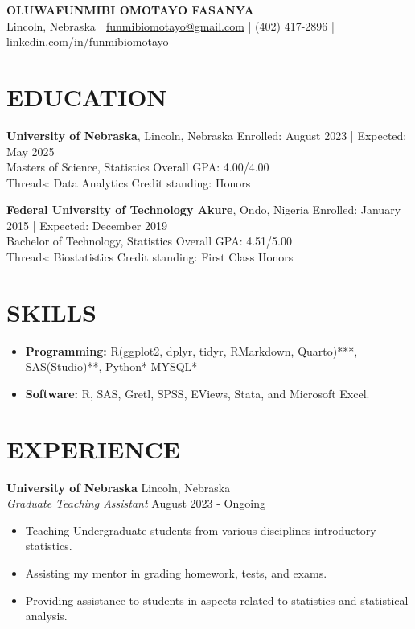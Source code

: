 \documentclass[a4paper,9pt]{extarticle}
\begin{document}
\pagestyle{empty}

\begin{center}
\textbf{\Large OLUWAFUNMIBI OMOTAYO FASANYA}\\[2pt] %
Lincoln, Nebraska | \href{mailto:example@example.com}{funmibiomotayo@gmail.com} | (402) 417-2896 | \href{https://www.linkedin.com/in/funmibiomotayo/}{linkedin.com/in/funmibiomotayo} 
\end{center}

\section*{EDUCATION}
\noindent
\textbf{University of Nebraska}, Lincoln, Nebraska \hfill Enrolled: August 2023 | Expected: May 2025\\ %
Masters of Science, Statistics \hfill Overall GPA: 4.00/4.00 \\ %
Threads: Data Analytics \hfill Credit standing: Honors %

\noindent
\textbf{Federal University of Technology Akure}, Ondo, Nigeria \hfill Enrolled: January 2015 | Expected: December 2019\\ %
Bachelor of Technology, Statistics \hfill Overall GPA: 4.51/5.00 \\ %
Threads: Biostatistics \hfill Credit standing: First Class Honors %

\section*{SKILLS}
\begin{itemize}
\item \textbf{Programming:} R(ggplot2, dplyr, tidyr, RMarkdown, Quarto)***, SAS(Studio)**, Python* MYSQL* %
\item \textbf{Software:} R, SAS, Gretl, SPSS, EViews, Stata, and Microsoft Excel. %
\end{itemize}

\section*{EXPERIENCE}
\noindent
\textbf{University of Nebraska} \hfill Lincoln, Nebraska \\ %
\textit{Graduate Teaching Assistant } \hfill August 2023  - Ongoing %
\begin{itemize}[topsep=0pt, partopsep=0pt, itemsep=0pt, parsep=0pt]
\item Teaching Undergraduate students from various disciplines introductory statistics.
\item Assisting my mentor in grading homework, tests, and exams.
\item Providing assistance to students in aspects related to statistics and statistical analysis.%
\end{itemize}
\end{document}
